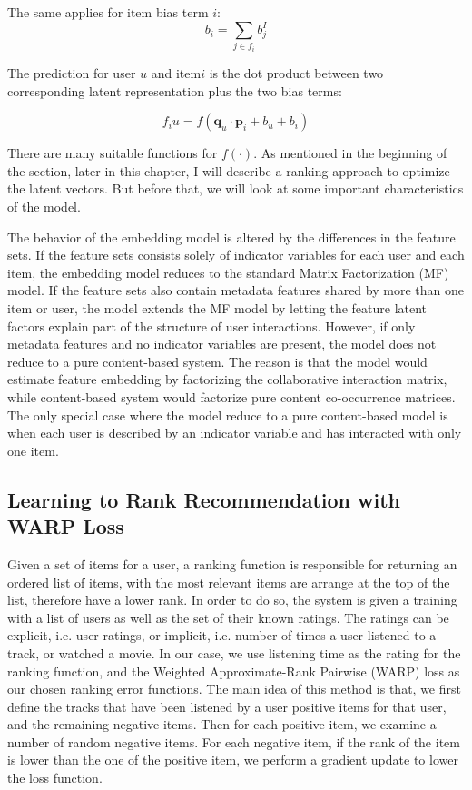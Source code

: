 \noindent The same applies for item bias term \(i\):
\begin{displaymath}
b_i = \sum_{j \in f_i} b_j^I
\end{displaymath}

The prediction for user \(u\) and item\(i\) is the dot product between two corresponding latent representation plus the two bias terms:

\begin{displaymath}
f_{i}u = f (\boldsymbol{q}_u  \cdot \boldsymbol{p}_i + b_u + b_i) \tag{2} \label{eq:2}
\end{displaymath}

\noindent There are many suitable functions for  \( f(\cdot)\). As mentioned in the beginning of the section, later in this chapter, I will describe a ranking approach to optimize the latent vectors. But before that, we will look at some important characteristics of the model. 

\noindent The behavior of the embedding model is altered by the differences in the feature sets. If the feature sets consists solely of indicator variables for each user and each item, the embedding model reduces to the standard Matrix Factorization (MF) model. If the feature sets also contain metadata features shared by more than one item or user, the model extends the MF model by letting the feature latent factors explain part of the structure of user interactions. However, if only metadata features and no indicator variables are present, the model does not reduce to a pure content-based system. The reason is that the model would estimate feature embedding by factorizing the collaborative interaction matrix, while content-based system would factorize pure content co-occurrence matrices. The only special case where the model reduce to a pure content-based model is when each user is described by an indicator variable and has interacted with only one item. 

\subsection{Learning to Rank Recommendation with WARP Loss}
Given a set of items for a user, a ranking function is responsible for returning an ordered list of items, with the most relevant items are arrange at the top of the list, therefore have a lower rank. In order to do so, the system is given a training with a list of users as well as the set of their known ratings. The ratings can be explicit, i.e. user ratings, or implicit, i.e. number of times a user listened to a track, or watched a movie. In our case, we use listening time as the rating for the ranking function, and the Weighted Approximate-Rank Pairwise (WARP) loss \cite{weston2011wsabie} as our chosen ranking error functions. The main idea of this method is that, we first define the tracks that have been listened by a user positive items for that user, and the remaining negative items. Then for each positive item, we examine a number of random negative items. For each negative item, if the rank of the item is lower than the one of the positive item, we perform a gradient update to lower the loss function. \hfill \break

